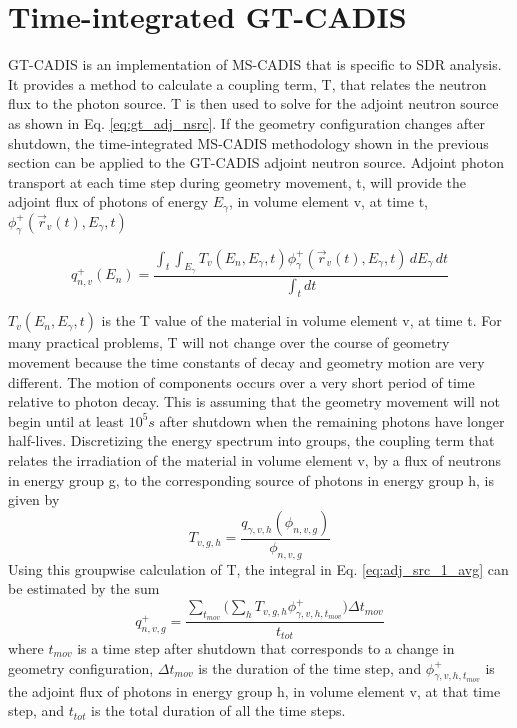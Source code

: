 \section{Time-integrated GT-CADIS}
GT-CADIS is an implementation of MS-CADIS that is specific to SDR analysis.  It
provides a method to calculate a coupling term, T, that relates the neutron
flux to the photon source.
T is then used to solve for the adjoint neutron source as shown in Eq.
\ref{eq:gt_adj_nsrc}.
If the geometry configuration changes after shutdown, the time-integrated
MS-CADIS methodology shown in the previous section can be applied to the
GT-CADIS adjoint neutron source.  Adjoint photon transport at each time step
during geometry movement, t, will provide the adjoint flux 
of photons of energy $E_{\gamma}$, in volume element v, at time t,
$\phi_{\gamma}^{+}(\overrightarrow{r}_{v}(t), E_{\gamma},t) $

 \begin{equation}\label{eq:adj_src_1_avg}
	 q_{n,v}^{+}(E_{n}) =\frac
	 {\int_{t}  \int_{E_{\gamma}}
	 T_{v}(E_n, E_{\gamma}, t) 
	 \phi_{\gamma}^{+}(\overrightarrow{r}_{v}(t), E_{\gamma},t)
	 \, dE_{\gamma} \, dt}
	 {\int_t dt}
 \end{equation}

$T_{v}(E_n, E_{\gamma}, t) $ is the T value of the material in volume
element v, at time t.
For many practical problems, T will not change over the course of
geometry movement  because the time constants of decay and geometry
motion are very different.  The motion of components occurs over a very short
period of time relative to photon decay.  This is assuming that the geometry
movement will not begin until at least $10^5 s$ after shutdown when the remaining
photons have longer half-lives.  
Discretizing the energy spectrum into groups, the coupling term that relates 
the irradiation of the material in volume
element v, by a flux of neutrons in energy group g, to the corresponding source of
photons in energy group h, 
is given by
\begin{equation}\label{eq:T}
	T_{v,g,h} = \dfrac{q_{\gamma,v,h}(\phi_{n,v,g})}{\phi_{n,v,g}}
\end{equation}
Using this groupwise calculation of T, the integral in Eq. \ref{eq:adj_src_1_avg} can be estimated by the sum
\begin{equation}\label{eq:tgt_n_src}
	q_{n,v,g}^{+} = \frac
	{\sum_{t_{mov}}\big(\sum_{h} T_{v,g,h}
	\phi_{\gamma,v,h,t_{mov}}^{+}\big) \Delta t_{mov}}
	{t_{tot}}
\end{equation}
where $t_{mov}$ is a time step after shutdown that corresponds to a change in
geometry configuration, $\Delta t_{mov}$ is the duration of the time step, and $\phi_{\gamma,v,h,t_{mov}}^{+}$ is the adjoint flux
of photons in energy group h, in volume element v, at that time step, and
$t_{tot}$ is the total duration of all the time steps.
